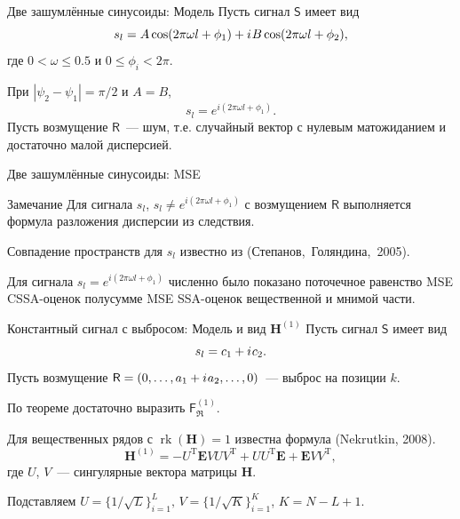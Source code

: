 \documentclass[ucs, notheorems, handout]{beamer}
\DeclareMathOperator{\rk}{rk}
\newcommand{\tX}[1]{\mathsf{#1}}
\newcommand{\iu}{{i\mkern1mu}}
\begin{document}
\begin{frame}{Две зашумлённые синусоиды: Модель}
Пусть сигнал $\tX{S}$ имеет вид
\begin{equation*}
\label{eq:general_ts}
s_l = A\cos(2 \pi\omega l + \phi_1) + \iu B\cos(2 \pi\omega l + \phi_2),
\end{equation*}
где $0<\omega\le 0.5$ и $0\le\phi_i < 2\pi$.

При $|\psi_2-\psi_1| = \pi/2$ и $A=B$, 
$$s_l = e^{i(2 \pi\omega l + \phi_1)}.$$
Пусть возмущение $\tX{R}$~--- шум, т.е. случайный вектор с нулевым матожиданием и достаточно малой дисперсией.

\end{frame}

\begin{frame}{Две зашумлённые синусоиды: MSE}
\begin{block}{Замечание}
    Для сигнала $s_l$, $s_l \neq e^{i(2 \pi\omega l + \phi_1)}$ с возмущением $\tX{R}$ выполняется формула разложения дисперсии из следствия.
\end{block}

Совпадение пространств для $s_l$ известно из (Степанов,~Голяндина,~2005).

Для сигнала $s_l = e^{i(2 \pi\omega l + \phi_1)}$ численно было показано поточечное равенство MSE CSSA-оценок полусумме MSE SSA-оценок вещественной и мнимой части. 

\end{frame}

\begin{frame}{Константный сигнал с выбросом: Модель и вид $\mathbf{H}^{(1)}$}
Пусть сигнал $\tX{S}$ имеет вид
$$s_l = c_1 + \iu c_2.$$
Пусть возмущение $\tX{R} = (0, \ldots, a_1 + \iu a_2, \ldots, 0)$~--- выброс на позиции $k$.

По теореме достаточно выразить $\tX{F}^{(1)}_{\Re}$.

Для вещественных рядов с $\rk(\mathbf{H}) = 1$ известна формула (Nekrutkin, 2008).
$$\mathbf{H}^{(1)} = -U^{\mathrm{T}} \mathbf{E} V U V^{\mathrm{T}} + U U^{\mathrm{T}} \mathbf{E} + \mathbf{E} V V^{\mathrm{T}},$$
где $U$, $V$~--- сингулярные вектора матрицы $\mathbf{H}$.

Подставляем  $U = \{1/\sqrt{L}\}^{L}_{i = 1},\, V = \{1/\sqrt{K}\}^{K}_{i = 1}$, $K = N - L + 1$.
\end{frame}
\end{document}
